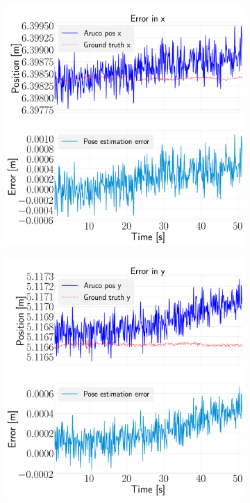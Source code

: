 \documentclass[../Head/report.tex]{subfiles}
\begin{document}
\begin{figure}[H]
    \centering
    \begin{subfigure}[t]{.30\textwidth}
        \centering
        \includegraphics[width=\textwidth]{../Figures/optitrack/steady_aruco_pose_estimation/pose_error_x_test1.png}
        \caption{}
        \label{fig:optitrack_steady_state_pose_estimation_error_x_test_five}
    \end{subfigure}
     \hspace{0.2em}
    \begin{subfigure}[t]{.30\textwidth}
        \centering
        \includegraphics[width=\textwidth]{../Figures/optitrack/steady_aruco_pose_estimation/pose_error_y_test1.png}

\end{subfigure}
\end{figure}
\end{document}
